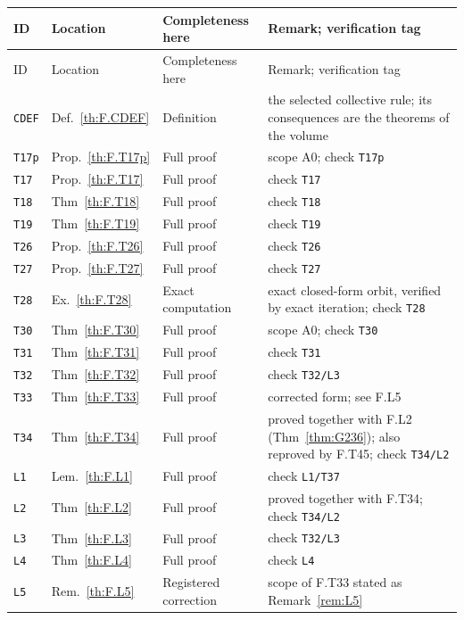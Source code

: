 \footnotesize
\begin{longtable}{@{}p{14mm}p{17mm}p{27mm}p{58mm}@{}}
\toprule ID & Location & Completeness here & Remark; verification tag\\\midrule\endfirsthead
\toprule ID & Location & Completeness here & Remark; verification tag\\\midrule\endhead
\texttt{CDEF} & Def.~\ref{th:F.CDEF} & Definition & the selected collective rule; its consequences are the theorems of the volume \\
\texttt{T17p} & Prop.~\ref{th:F.T17p} & Full proof & scope A0; check \texttt{T17p} \\
\texttt{T17} & Prop.~\ref{th:F.T17} & Full proof & check \texttt{T17} \\
\texttt{T18} & Thm~\ref{th:F.T18} & Full proof & check \texttt{T18} \\
\texttt{T19} & Thm~\ref{th:F.T19} & Full proof & check \texttt{T19} \\
\texttt{T26} & Prop.~\ref{th:F.T26} & Full proof & check \texttt{T26} \\
\texttt{T27} & Prop.~\ref{th:F.T27} & Full proof & check \texttt{T27} \\
\texttt{T28} & Ex.~\ref{th:F.T28} & Exact computation & exact closed-form orbit, verified by exact iteration; check \texttt{T28} \\
\texttt{T30} & Thm~\ref{th:F.T30} & Full proof & scope A0; check \texttt{T30} \\
\texttt{T31} & Thm~\ref{th:F.T31} & Full proof & check \texttt{T31} \\
\texttt{T32} & Thm~\ref{th:F.T32} & Full proof & check \texttt{T32/L3} \\
\texttt{T33} & Thm~\ref{th:F.T33} & Full proof & corrected form; see F.L5 \\
\texttt{T34} & Thm~\ref{th:F.T34} & Full proof & proved together with F.L2 (Thm~\ref{thm:G236}); also reproved by F.T45; check \texttt{T34/L2} \\
\texttt{L1} & Lem.~\ref{th:F.L1} & Full proof & check \texttt{L1/T37} \\
\texttt{L2} & Thm~\ref{th:F.L2} & Full proof & proved together with F.T34; check \texttt{T34/L2} \\
\texttt{L3} & Thm~\ref{th:F.L3} & Full proof & check \texttt{T32/L3} \\
\texttt{L4} & Thm~\ref{th:F.L4} & Full proof & check \texttt{L4} \\
\texttt{L5} & Rem.~\ref{th:F.L5} & Registered correction & scope of F.T33 stated as Remark~\ref{rem:L5} \\

\end{longtable}
